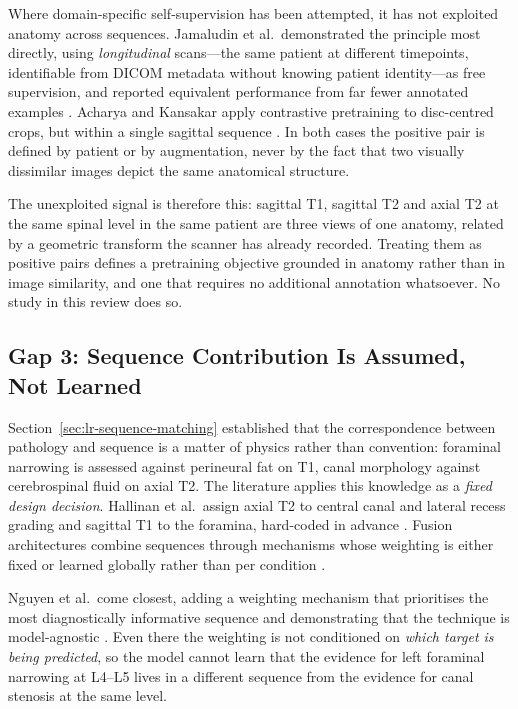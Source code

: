 Where domain-specific self-supervision has been attempted, it has not exploited
anatomy across sequences. Jamaludin et al.\ demonstrated the principle most
directly, using \emph{longitudinal} scans---the same patient at different
timepoints, identifiable from DICOM metadata without knowing patient
identity---as free supervision, and reported equivalent performance from far
fewer annotated examples \cite{jamaludin2017selfsupervised}. Acharya and Kansakar
apply contrastive pretraining to disc-centred crops, but within a single sagittal
sequence \cite{acharya2026disccentric}. In both cases the positive pair is
defined by patient or by augmentation, never by the fact that two visually
dissimilar images depict the same anatomical structure.

The unexploited signal is therefore this: sagittal T1, sagittal T2 and axial T2 at
the same spinal level in the same patient are three views of one anatomy, related
by a geometric transform the scanner has already recorded. Treating them as
positive pairs defines a pretraining objective grounded in anatomy rather than in
image similarity, and one that requires no additional annotation whatsoever. No
study in this review does so.

\subsection{Gap 3: Sequence Contribution Is Assumed, Not Learned}
\label{sec:lr-gap-routing}

Section~\ref{sec:lr-sequence-matching} established that the correspondence between
pathology and sequence is a matter of physics rather than convention: foraminal
narrowing is assessed against perineural fat on T1, canal morphology against
cerebrospinal fluid on axial T2. The literature applies this knowledge as a
\emph{fixed design decision}. Hallinan et al.\ assign axial T2 to central canal
and lateral recess grading and sagittal T1 to the foramina, hard-coded in advance
\cite{hallinan2021deep}. Fusion architectures combine sequences through
mechanisms whose weighting is either fixed or learned globally rather than per
condition \cite{batra2025mscan,park2025multiview}.

Nguyen et al.\ come closest, adding a weighting mechanism that prioritises the
most diagnostically informative sequence and demonstrating that the technique is
model-agnostic \cite{nguyen2026crossspine}. Even there the weighting is not
conditioned on \emph{which target is being predicted}, so the model cannot learn
that the evidence for left foraminal narrowing at L4--L5 lives in a different
sequence from the evidence for canal stenosis at the same level.

